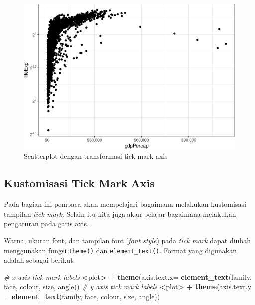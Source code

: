 \documentclass[]{book}
\newenvironment{Shaded}{\begin{snugshade}}{\end{snugshade}}
\newcommand{\KeywordTok}[1]{\textcolor[rgb]{0.13,0.29,0.53}{\textbf{#1}}}
\newcommand{\DataTypeTok}[1]{\textcolor[rgb]{0.13,0.29,0.53}{#1}}
\newcommand{\StringTok}[1]{\textcolor[rgb]{0.31,0.60,0.02}{#1}}
\newcommand{\CommentTok}[1]{\textcolor[rgb]{0.56,0.35,0.01}{\textit{#1}}}
\newcommand{\OperatorTok}[1]{\textcolor[rgb]{0.81,0.36,0.00}{\textbf{#1}}}
\newcommand{\NormalTok}[1]{#1}
\begin{document}
\begin{figure}

{\centering \includegraphics[width=0.7\linewidth]{EnvStat_files/figure-latex/gglimits4-1} 

}

\caption{Scatterplot dengan transformasi tick mark axis }\label{fig:gglimits4}
\end{figure}

\subsection{Kustomisasi Tick Mark
Axis}\label{kustomisasi-tick-mark-axis}

Pada bagian ini pembaca akan mempelajari bagaimana melakukan kustomisasi
tampilan \emph{tick mark}. Selain itu kita juga akan belajar bagaimana
melakukan pengaturan pada garis axis.

Warna, ukuran font, dan tampilan font (\emph{font style}) pada
\emph{tick mark} dapat diubah menggunakan fungsi \texttt{theme()} dan
\texttt{element\_text()}. Format yang digunakan adalah sebagai berikut:

\begin{Shaded}
\begin{Highlighting}[]
\CommentTok{# x axis tick mark labels}
\OperatorTok{<}\NormalTok{plot}\OperatorTok{>}\StringTok{ }\OperatorTok{+}\StringTok{ }\KeywordTok{theme}\NormalTok{(}\DataTypeTok{axis.text.x=} \KeywordTok{element_text}\NormalTok{(family, face, colour, size, angle))}
\CommentTok{# y axis tick mark labels}
\OperatorTok{<}\NormalTok{plot}\OperatorTok{>}\StringTok{ }\OperatorTok{+}\StringTok{ }\KeywordTok{theme}\NormalTok{(}\DataTypeTok{axis.text.y =} \KeywordTok{element_text}\NormalTok{(family, face, colour, size, angle))}
\end{Highlighting}
\end{Shaded}
\end{document}

